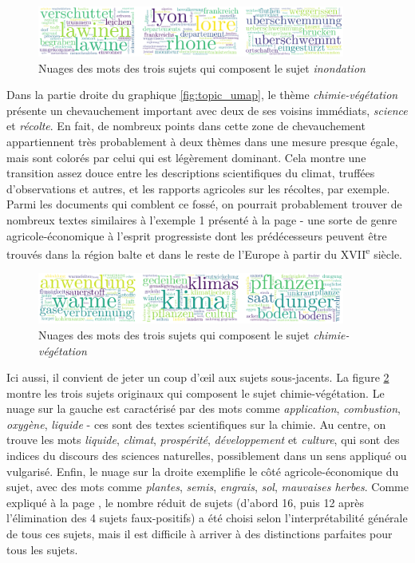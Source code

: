 \documentclass[a4paper,twoside,12pt]{article}
\begin{document}
\begin{figure}[h]
    \centering
    \includegraphics[width=0.9\textwidth]{images/subtopics_wordcloud_9.pdf}
    \caption{Nuages des mots des trois sujets qui composent le sujet \textit{inondation}}
    \label{fig:suptopic_worcloud_9}
\end{figure}


Dans la partie droite du graphique \ref{fig:topic_umap}, le thème \textit{chimie-végétation} présente un chevauchement important avec deux de ses voisins immédiats, \textit{science} et \textit{récolte}. En fait, de nombreux points dans cette zone de chevauchement appartiennent très probablement à deux thèmes dans une mesure presque égale, mais sont colorés par celui qui est légèrement dominant. Cela montre une transition assez douce entre les descriptions scientifiques du climat, truffées d'observations et autres, et les rapports agricoles sur les récoltes, par exemple. Parmi les documents qui comblent ce fossé, on pourrait probablement trouver de nombreux textes similaires à l'exemple 1 présenté à la page \pageref{topic1_chimie-vegetation} - une sorte de genre agricole-économique à l'esprit progressiste dont les prédécesseurs peuvent être trouvés dans la région balte et dans le reste de l'Europe à partir du XVII\textsuperscript{e} siècle.

\begin{figure}[h]
    \centering
    \includegraphics[width=0.9\textwidth]{images/subtopics_wordcloud_1.pdf}
    \caption{Nuages des mots des trois sujets qui composent le sujet \textit{chimie-végétation}}
    \label{fig:suptopic_worcloud_1}
\end{figure}

Ici aussi, il convient de jeter un coup d'œil aux sujets sous-jacents. La figure \ref{fig:suptopic_worcloud_1} montre les trois sujets originaux qui composent le sujet chimie-végétation. Le nuage sur la gauche est caractérisé par des mots comme \textit{application}, \textit{combustion}, \textit{oxygène}, \textit{liquide} - ces sont des textes scientifiques sur la chimie. Au centre, on trouve les mots \textit{liquide}, \textit{climat}, \textit{prospérité}, \textit{développement} et \textit{culture}, qui sont des indices du discours des sciences naturelles, possiblement dans un sens appliqué ou vulgarisé. Enfin, le nuage sur la droite exemplifie le côté agricole-économique du sujet, avec des mots comme \textit{plantes}, \textit{semis}, \textit{engrais}, \textit{sol}, \textit{mauvaises herbes}. Comme expliqué à la page \pageref{46_topics}, le nombre réduit de sujets (d'abord 16, puis 12 après l'élimination des 4 sujets faux-positifs) a été choisi selon l'interprétabilité générale de tous ces sujets, mais il est difficile à arriver à des distinctions parfaites pour tous les sujets.
\end{document}
